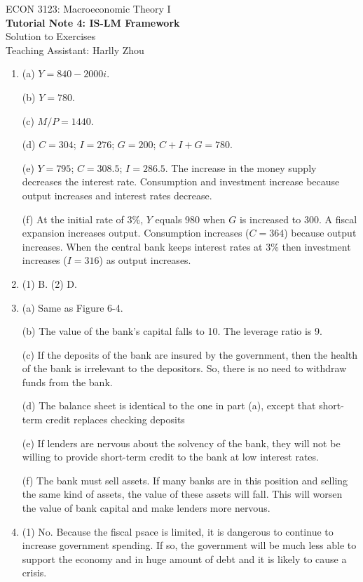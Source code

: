\documentclass[12pt]{article}
\begin{document}
\begin{center}
    ECON 3123: Macroeconomic Theory I\\
    {\large \textbf{Tutorial Note 4: IS-LM Framework}}\\
    Solution to Exercises\\
    Teaching Assistant: Harlly Zhou
\end{center}

\begin{enumerate}[label=\arabic*.]
    \item (a) $Y = 840 - 2000 i$.
    
    (b) $Y = 780$.

    (c) $M/P = 1440$.

    (d) $C=304$; $I=276$; $G=200$; $C+I+G=780$.

    (e) $Y = 795$; $C =308.5$; $I = 286.5$. The increase in the money supply decreases the interest rate. Consumption and investment increase because output increases and interest rates decrease.

    (f) At the initial rate of 3\%, $Y$ equals 980 when $G$ is increased to 300. A fiscal expansion increases output. Consumption increases ($C = 364$) because output increases. When the central bank keeps interest rates at 3\% then investment increases ($I = 316$) as output increases.
    \item (1) B. (2) D.
    \item (a) Same as Figure 6-4.
    
    (b) The value of the bank's capital falls to 10. The leverage ratio is 9.
    
    (c) If the deposits of the bank are insured by the government, then the health of the bank is irrelevant to the depositors. So, there is no need to withdraw funds from the bank.
    
    (d) The balance sheet is identical to the one in part (a), except that short-term credit replaces checking deposits
    
    (e) If lenders are nervous about the solvency of the bank, they will not be willing to provide short-term credit to the bank at low interest rates.
    
    (f) The bank must sell assets. If many banks are in this position and selling the same kind of assets, the value of these assets will fall. This will worsen the value of bank capital and make lenders more nervous.
    \item (1) No. Because the fiscal psace is limited, it is dangerous to continue to increase government spending. If so, the government will be much less able to support the economy and
    in huge amount of debt and it is likely to cause a crisis.
    

\end{enumerate}
\end{document}

